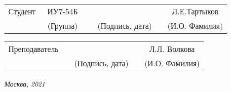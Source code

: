 \vspace{1.5cm}
\noindent
\begin{tabular}{l c c c c c}
	Студент      & ~ИУ7-54Б~               & \hspace{2.5cm} & \hspace{3cm}                 & &  Л.Е.Тартыков \\\cline{2-2}\cline{4-4} \cline{6-6}
	\hspace{3cm} & {\footnotesize(Группа)} &                & {\footnotesize(Подпись, дата)} & & {\footnotesize(И.О. Фамилия)}
\end{tabular}

\vspace{1cm}

\noindent
\begin{tabular}{l c c c c}
	Преподаватель & \hspace{5cm}   & \hspace{3cm}                 & & Л.Л. Волкова \\\cline{3-3} \cline{5-5} 
	\hspace{3cm}  &                & {\footnotesize(Подпись, дата)} & & {\footnotesize(И.О. Фамилия)}
\end{tabular}

\begin{center}	
	\vfill
	\large \textit {Москва, 2021}
\end{center}

\thispagestyle {empty}
\pagebreak